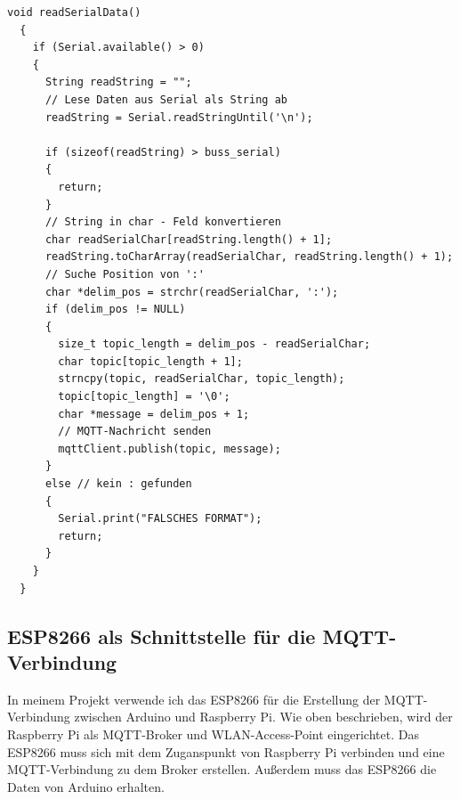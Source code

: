 \documentclass[12pt, letterpaper]{article}
\begin{document}
\begin{Verbatim}[frame=single]
  void readSerialData()
  {
    if (Serial.available() > 0)
    {
      String readString = "";
      // Lese Daten aus Serial als String ab
      readString = Serial.readStringUntil('\n');
      
      if (sizeof(readString) > buss_serial)
      {
        return;
      }
      // String in char - Feld konvertieren
      char readSerialChar[readString.length() + 1];
      readString.toCharArray(readSerialChar, readString.length() + 1);
      // Suche Position von ':'
      char *delim_pos = strchr(readSerialChar, ':');
      if (delim_pos != NULL)
      {
        size_t topic_length = delim_pos - readSerialChar;
        char topic[topic_length + 1];
        strncpy(topic, readSerialChar, topic_length);
        topic[topic_length] = '\0';
        char *message = delim_pos + 1;
        // MQTT-Nachricht senden
        mqttClient.publish(topic, message);
      }
      else // kein : gefunden
      {
        Serial.print("FALSCHES FORMAT");
        return;
      }
    }
  }
\end{Verbatim}
\subsection[ESP8266-Raspberry Pi]{ESP8266 als Schnittstelle für die MQTT-Verbindung}
\par In meinem Projekt verwende ich das ESP8266 für die Erstellung der MQTT-Verbindung zwischen Arduino und Raspberry Pi. Wie oben beschrieben, wird der Raspberry Pi als MQTT-Broker und WLAN-Access-Point eingerichtet. Das ESP8266 muss sich mit dem Zuganspunkt von Raspberry Pi verbinden und eine MQTT-Verbindung zu dem Broker erstellen. Außerdem muss das ESP8266 die Daten von Arduino erhalten.
\end{document}

